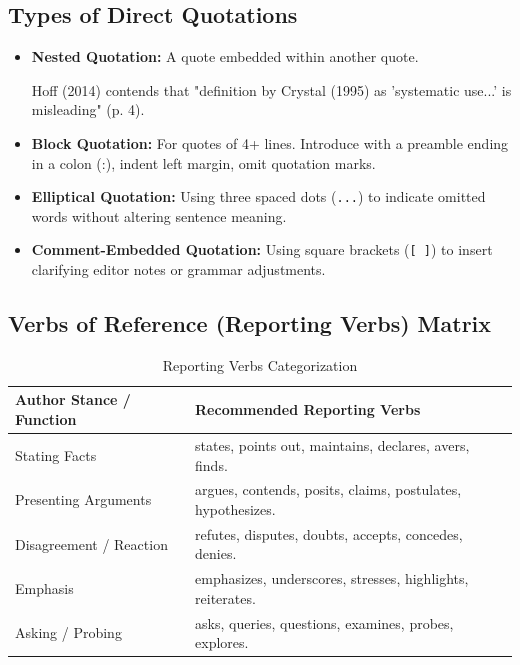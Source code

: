 \documentclass[11pt, a4paper]{article}
\begin{document}
\subsection{Types of Direct Quotations}
\begin{itemize}
    \item \textbf{Nested Quotation:} A quote embedded within another quote.
    \begin{mdframed}[style=summarybox]
        Hoff (2014) contends that "definition by Crystal (1995) as 'systematic use...' is misleading" (p. 4).
    \end{mdframed}
    \item \textbf{Block Quotation:} For quotes of 4+ lines. Introduce with a preamble ending in a colon (:), indent left margin, omit quotation marks.
    \item \textbf{Elliptical Quotation:} Using three spaced dots (\texttt{...}) to indicate omitted words without altering sentence meaning.
    \item \textbf{Comment-Embedded Quotation:} Using square brackets (\texttt{[ ]}) to insert clarifying editor notes or grammar adjustments.
\end{itemize}

\subsection{Verbs of Reference (Reporting Verbs) Matrix}
\begin{table}[htbp]
\centering
\small
\caption{Reporting Verbs Categorization}
\begin{tabular}{lp{10cm}}
\toprule
\textbf{Author Stance / Function} & \textbf{Recommended Reporting Verbs} \\
\midrule
Stating Facts & states, points out, maintains, declares, avers, finds. \\
Presenting Arguments & argues, contends, posits, claims, postulates, hypothesizes. \\
Disagreement / Reaction & refutes, disputes, doubts, accepts, concedes, denies. \\
Emphasis & emphasizes, underscores, stresses, highlights, reiterates. \\
Asking / Probing & asks, queries, questions, examines, probes, explores. \\
\bottomrule
\end{tabular}
\end{table}

\newpage
\end{document}
